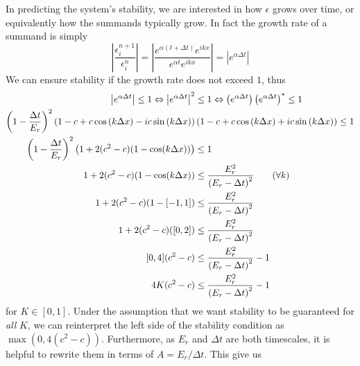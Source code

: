 \documentclass[11pt]{article}
\begin{document}
In predicting the system's stability, we are interested in how $\epsilon$ grows over time, or equivalently how the summands typically grow. In fact the growth rate of a summand is simply
\[
\left|\frac{\epsilon^{n+1}_i}{\epsilon^n_i}\right| = \left|\frac{e^{\alpha\left(t+\Delta t\right)}e^{ikx}}{e^{\alpha t}e^{ikx}}\right| = \left|e^{\alpha\Delta t}\right|
\]
We can ensure stability if the growth rate does not exceed $1$, thus
\begin{align}
\left|e^{\alpha\Delta t}\right|\leq 1 \Leftrightarrow
\left|e^{\alpha\Delta t}\right|^2&\leq 1 \Leftrightarrow
\left(e^{\alpha\Delta t}\right)\left(e^{\alpha\Delta t}\right)^*\leq 1 \nonumber\\
\left(1-\frac{\Delta t}{E_r}\right)^2
\left(1-c+c\cos\left(k\Delta x\right)-ic\sin\left(k\Delta x\right)\right) &
\left(1-c+c\cos\left(k\Delta x\right)+ic\sin\left(k\Delta x\right)\right)\leq 1 \nonumber\\
\left(1-\frac{\Delta t}{E_r}\right)^2\left(1+2(c^2-c)(1-\cos(k\Delta x))\right) &\leq 1 \nonumber\\
1+2(c^2-c)(1-\cos(k\Delta x)) &\leq \frac{E_r^2}{\left(E_r-\Delta t\right)^2}		\text{\quad\quad($\forall k$)} \nonumber\\
1+2(c^2-c)(1-[-1,1]) &\leq \frac{E_r^2}{\left(E_r-\Delta t\right)^2} \nonumber\\
1+2(c^2-c)([0,2]) &\leq \frac{E_r^2}{\left(E_r-\Delta t\right)^2} \nonumber\\
[0,4](c^2-c)	&\leq \frac{E_r^2}{\left(E_r-\Delta t\right)^2}-1 \nonumber \\
4K(c^2-c) &\leq \frac{E_r^2}{\left(E_r-\Delta t\right)^2}-1		\label{eq:stable}
\end{align}
for $K\in[0,1]$. Under the assumption that we want stability to be guaranteed for \emph{all} $K$, we can reinterpret the left side of the stability condition as $\max\left(0,4(c^2-c)\right)$. Furthermore, as $E_r$ and $\Delta t$ are both timescales, it is helpful to rewrite them in terms of $A=E_r/\Delta t$. This give us
\end{document}

